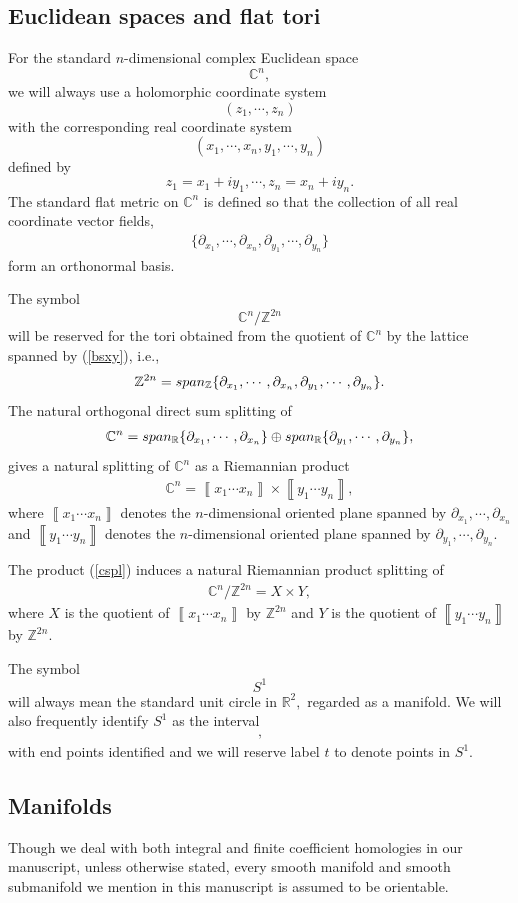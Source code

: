 \documentclass[11pt,a4paper]{amsart}
\numberwithin{equation}{section}
\newcommand{\cd}{\cdots}
\newcommand{\cu}[1]{\left\llbracket#1\right\rrbracket}
\newcommand{\pd}{\partial}
\newcommand{\R}{\mathbb{R}}
\newcommand{\Z}{\mathbb{Z}}
\newcommand{\C}{\mathbb{C}}
\theoremstyle{plain}
\theoremstyle{definition}
\numberwithin{equation}{subsection}
\begin{document}
\subsection{Euclidean spaces and flat tori}\label{seceuc}
For the standard $n$-dimensional complex Euclidean space $$\C^n,$$ we will always use a holomorphic coordinate system $$(z_1,\cd,z_n)$$ with the corresponding real coordinate system $$(x_1,\cd,x_n,y_1,\cd,y_n)$$ defined by 
$$z_1=x_1+iy_1,\cd,z_n=x_n+iy_n.$$ The standard flat metric on $\C^n$ is defined so that the collection of all real coordinate vector fields,  \begin{align}\label{bsxy}
\{\pd_{x_1},\cd,\pd_{x_n},\pd_{y_1},\cd,\pd_{y_n}\}
\end{align}
 form an orthonormal basis.

The symbol $$\C^n/\Z^{2n}$$ will be reserved for the tori obtained from the quotient of $\C^n$ by the lattice spanned by (\ref{bsxy}), i.e.,
\begin{align*}
\Z^{2n}=\textnormal{span}_{\Z}\{\pd_{x_1},\cd,\pd_{x_n},\pd_{y_1},\cd,\pd_{y_n}\}.
\end{align*}
The natural orthogonal direct sum splitting of 
\begin{align*}
	\C^n=\textnormal{span}_{\R}\{\pd_{x_1},\cd,\pd_{x_n}\}\oplus\textnormal{span}_{\R}\{\pd_{y_1},\cd,\pd_{y_n}\},
\end{align*}
gives a natural splitting of $\C^n$ as a Riemannian product
\begin{align}\label{cspl}
	\C^n=\cu{x_1\cd x_n}\times \cu{y_1\cd y_n},
\end{align}
where $\cu{x_1\cd x_n}$ denotes the $n$-dimensional oriented plane spanned by $\pd_{x_1},\cd,\pd_{x_n}$ and $\cu{y_1\cd y_n}$ denotes the $n$-dimensional oriented plane spanned by $\pd_{y_1},\cd,\pd_{y_n}.$

The product (\ref{cspl}) induces a natural Riemannian product splitting of
\begin{align*}
	\C^n/\Z^{2n}=X\times Y,
\end{align*}
where $X$ is the quotient of $\cu{x_1\cd x_n}$ by $\Z^{2n}$ and $Y$ is the quotient of $\cu{y_1\cd y_n}$ by $\Z^{2n}.$

The symbol $$S^1$$ will always mean the standard unit circle in $\R^2,$ regarded as a manifold. We will also frequently identify $S^1$ as the interval
\begin{align*}
[-{\pi}{},{\pi}{}],
\end{align*}
  with end points identified and we will reserve label $t$ to denote points in $S^1.$	\subsection{Manifolds}\label{bdmn}
	Though we deal with both integral and finite coefficient homologies in our manuscript, unless otherwise stated, every smooth manifold and smooth submanifold we mention in this manuscript is assumed to be orientable.  
	
\end{document}
